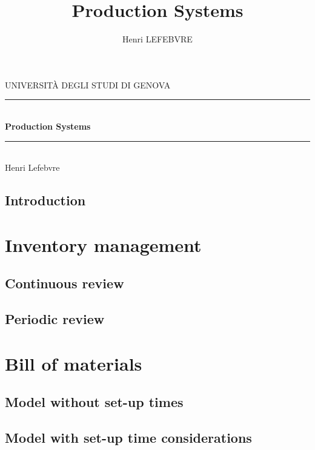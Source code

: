 \documentclass{report}
\title{Production Systems}
\author{Henri LEFEBVRE}
\begin{document}
    \hspace{\textwidth}
    \vspace{3cm}
    \begin{center}
        {\Large UNIVERSIT\`A DEGLI STUDI DI GENOVA}
        \rule{\textwidth}{.3mm}\\
        \vspace{.5cm}
        {\huge\bfseries Production Systems }\\
        \vspace{.2cm}
        \rule{\textwidth}{.3mm}\\
        \vspace{1cm}
        {\large Henri Lefebvre}
    \end{center}
    \begin{figure}[h!]\thispagestyle{empty}\end{figure}
    \newpage

    \tableofcontents

    \setlength\parskip{0.5cm}

    \chapter*{Introduction}
    

    \part{Inventory management}
    \chapter{Continuous review}
    

    \chapter{Periodic review}
    

    \part{Bill of materials}
    \chapter{Model without set-up times}
    

    \chapter{Model with set-up time considerations}
    
\end{document}
